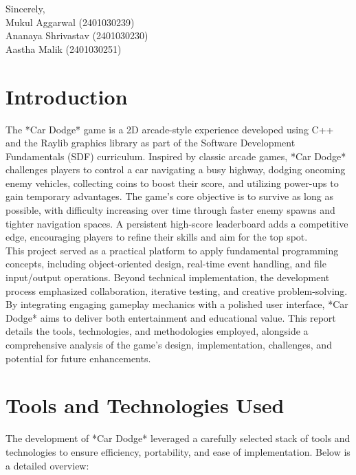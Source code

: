 \documentclass[12pt,a4paper]{article}
\begin{document}
\noindent
Sincerely, \\
\vspace{2em}
\noindent
Mukul Aggarwal (2401030239) \\
Ananaya Shrivastav (2401030230) \\
Aastha Malik (2401030251) \\

\newpage

\tableofcontents

\newpage

\section{Introduction}

The *Car Dodge* game is a 2D arcade-style experience developed using C++ and the Raylib graphics library as part of the Software Development Fundamentals (SDF) curriculum. Inspired by classic arcade games, *Car Dodge* challenges players to control a car navigating a busy highway, dodging oncoming enemy vehicles, collecting coins to boost their score, and utilizing power-ups to gain temporary advantages. The game’s core objective is to survive as long as possible, with difficulty increasing over time through faster enemy spawns and tighter navigation spaces. A persistent high-score leaderboard adds a competitive edge, encouraging players to refine their skills and aim for the top spot. \\

This project served as a practical platform to apply fundamental programming concepts, including object-oriented design, real-time event handling, and file input/output operations. Beyond technical implementation, the development process emphasized collaboration, iterative testing, and creative problem-solving. By integrating engaging gameplay mechanics with a polished user interface, *Car Dodge* aims to deliver both entertainment and educational value. This report details the tools, technologies, and methodologies employed, alongside a comprehensive analysis of the game’s design, implementation, challenges, and potential for future enhancements. \\

\section{Tools and Technologies Used}

The development of *Car Dodge* leveraged a carefully selected stack of tools and technologies to ensure efficiency, portability, and ease of implementation. Below is a detailed overview: \\
\end{document}
